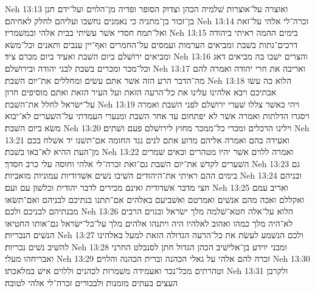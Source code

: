 Neh 13:13  ואוצרה על־אוצרות שׁלמיה הכהן וצדוק הסופר ופדיה מן־הלוים ועל־ידם חנן בן־זכור בן־מתניה כי נאמנים נחשׁבו ועליהם לחלק לאחיהם׃
Neh 13:14  זכרה־לי אלהי על־זאת ואל־תמח חסדי אשׁר עשׂיתי בבית אלהי ובמשׁמריו׃
Neh 13:15  בימים ההמה ראיתי ביהודה דרכים־גתות בשׁבת ומביאים הערמות ועמסים על־החמרים ואף־יין ענבים ותאנים וכל־משׂא ומביאים ירושׁלם ביום השׁבת ואעיד ביום מכרם ציד׃
Neh 13:16  והצרים ישׁבו בה מביאים דאג וכל־מכר ומכרים בשׁבת לבני יהודה ובירושׁלם׃
Neh 13:17  ואריבה את חרי יהודה ואמרה להם מה־הדבר הרע הזה אשׁר אתם עשׂים ומחללים את־יום השׁבת׃
Neh 13:18  הלוא כה עשׂו אבתיכם ויבא אלהינו עלינו את כל־הרעה הזאת ועל העיר הזאת ואתם מוסיפים חרון על־ישׂראל לחלל את־השׁבת׃
Neh 13:19  ויהי כאשׁר צללו שׁערי ירושׁלם לפני השׁבת ואמרה ויסגרו הדלתות ואמרה אשׁר לא יפתחום עד אחר השׁבת ומנערי העמדתי על־השׁערים לא־יבוא משׂא ביום השׁבת׃
Neh 13:20  וילינו הרכלים ומכרי כל־ממכר מחוץ לירושׁלם פעם ושׁתים׃
Neh 13:21  ואעידה בהם ואמרה אליהם מדוע אתם לנים נגד החומה אם־תשׁנו יד אשׁלח בכם מן־העת ההיא לא־באו בשׁבת׃
Neh 13:22  ואמרה ללוים אשׁר יהיו מטהרים ובאים שׁמרים השׁערים לקדשׁ את־יום השׁבת גם־זאת זכרה־לי אלהי וחוסה עלי כרב חסדך׃
Neh 13:23  גם בימים ההם ראיתי את־היהודים השׁיבו נשׁים אשׁדודיות עמוניות מואביות׃
Neh 13:24  ובניהם חצי מדבר אשׁדודית ואינם מכירים לדבר יהודית וכלשׁון עם ועם׃
Neh 13:25  ואריב עמם ואקללם ואכה מהם אנשׁים ואמרטם ואשׁביעם באלהים אם־תתנו בנתיכם לבניהם ואם־תשׂאו מבנתיהם לבניכם ולכם׃
Neh 13:26  הלוא על־אלה חטא־שׁלמה מלך ישׂראל ובגוים הרבים לא־היה מלך כמהו ואהוב לאלהיו היה ויתנהו אלהים מלך על־כל־ישׂראל גם־אותו החטיאו הנשׁים הנכריות׃
Neh 13:27  ולכם הנשׁמע לעשׂת את כל־הרעה הגדולה הזאת למעל באלהינו להשׁיב נשׁים נכריות׃
Neh 13:28  ומבני יוידע בן־אלישׁיב הכהן הגדול חתן לסנבלט החרני ואבריחהו מעלי׃
Neh 13:29  זכרה להם אלהי על גאלי הכהנה וברית הכהנה והלוים׃
Neh 13:30  וטהרתים מכל־נכר ואעמידה משׁמרות לכהנים וללוים אישׁ במלאכתו׃
Neh 13:31  ולקרבן העצים בעתים מזמנות ולבכורים זכרה־לי אלהי לטובה׃



